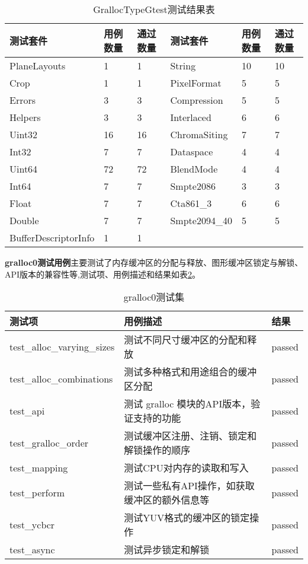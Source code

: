\begin{table}[H]
    \centering
    \caption{GrallocTypeGtest测试结果表}
    \label{tab:GrallocTypeGtest测试结果表}
    \begin{tabular}{llllll}
      \toprule
      测试套件 & 用例数量 &通过数量 & 测试套件 & 用例数量 &通过数量\\
      \midrule
      PlaneLayouts & 1 & 1 & String & 10 & 10 \\
      Crop & 1 & 1 & PixelFormat & 5 & 5 \\
      Errors & 3 & 3 & Compression & 5 & 5 \\
      Helpers & 3 & 3 & Interlaced & 6 & 6 \\
      Uint32 & 16 & 16 & ChromaSiting & 7 & 7 \\
      Int32 & 7 & 7 & Dataspace & 4 & 4 \\
      Uint64 & 72 & 72 & BlendMode & 4 & 4 \\
      Int64 & 7 & 7 & Smpte2086 & 3 & 3 \\
      Float & 7 & 7 & Cta861\_3 & 6 & 6 \\
      Double & 7 & 7 & Smpte2094\_40 & 5 & 5 \\
      BufferDescriptorInfo & 1 & 1 \\
      \bottomrule
    \end{tabular}
    \note{}
\end{table}


\textbf{gralloc0测试用例}主要测试了内存缓冲区的分配与释放、图形缓冲区锁定与解锁、API版本的兼容性等,测试项、用例描述和结果如表\ref{tab:gralloc0测试集}。

\begin{table}[H]
    \centering
    \caption{gralloc0测试集}
    \label{tab:gralloc0测试集}
    \begin{tabular}{lll}
      \toprule
      测试项 & 用例描述 & 结果 \\
      \midrule
      test\_alloc\_varying\_sizes & 测试不同尺寸缓冲区的分配和释放 & passed\\
      test\_alloc\_combinations & 测试多种格式和用途组合的缓冲区分配 & passed\\
      test\_api & 测试 gralloc 模块的API版本，验证支持的功能 & passed\\
      test\_gralloc\_order & 测试缓冲区注册、注销、锁定和解锁操作的顺序 & passed\\
      test\_mapping & 测试CPU对内存的读取和写入 & passed\\
      test\_perform & 测试一些私有API操作，如获取缓冲区的额外信息等 & passed\\
      test\_ycbcr & 测试YUV格式的缓冲区的锁定操作 & passed\\
      test\_async & 测试异步锁定和解锁 & passed\\
      \bottomrule
    \end{tabular}
    \note{}
\end{table}

